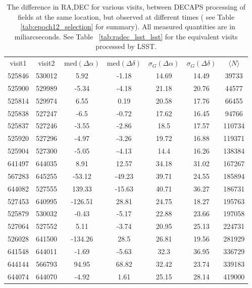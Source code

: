 \documentclass[DM,lsstdraft,toc,usenatbib]{lsstdoc}
\begin{document}
\begin{table}
\centering
\caption{The difference in RA,DEC for various visits, between DECAPS processing of fields at the same location, but observed at different times ( see Table ~\ref{tab:epoch12_selection} for summary). All  measured quantities are in miliarcseconds. See Table ~\ref{tab:radec_lsst_lsst} for the equivalent visits processed by LSST. }
\label{tab:radec_decaps_decaps}
\begin{tabular}{ccccccc}
visit1 & visit2 & $\mathrm{med}(\Delta\alpha)$ & $\mathrm{med}(\Delta\delta)$ & $\sigma_{G}(\Delta\alpha)$ & $\sigma_{G}(\Delta\delta)$ & $\langle N \rangle$ \\
525846 & 530012 & 5.92 & -1.18 & 14.69 & 14.49 & 39733 \\
525900 & 529989 & -5.34 & -4.18 & 21.18 & 20.76 & 44577 \\
525814 & 529974 & 6.55 & 0.19 & 20.58 & 17.76 & 66455 \\
525838 & 527247 & -6.5 & -0.72 & 17.62 & 16.45 & 94766 \\
525837 & 527246 & -3.55 & -2.86 & 18.5 & 17.57 & 110734 \\
525920 & 527296 & -4.97 & -3.26 & 19.72 & 16.88 & 119371 \\
525904 & 527300 & -5.05 & -4.13 & 14.4 & 16.26 & 138384 \\
641497 & 644035 & 8.91 & 12.57 & 34.18 & 31.02 & 167267 \\
567283 & 645255 & -53.12 & -49.23 & 39.71 & 24.55 & 185894 \\
644082 & 527555 & 139.33 & -15.63 & 40.71 & 36.27 & 186731 \\
527453 & 640995 & -126.51 & 28.81 & 24.75 & 18.27 & 195763 \\
525879 & 530032 & -0.43 & -5.17 & 22.88 & 23.66 & 197058 \\
527064 & 527552 & 5.11 & -3.74 & 20.95 & 25.13 & 224731 \\
526028 & 641500 & -134.26 & 28.5 & 26.81 & 19.56 & 281929 \\
641548 & 644011 & -1.69 & -5.63 & 32.3 & 36.95 & 336729 \\
644144 & 566793 & 94.95 & 68.82 & 32.42 & 23.74 & 339183 \\
644074 & 644070 & -4.92 & 1.61 & 25.15 & 28.14 & 419000 \\
\end{tabular}
\end{table}
\end{document}
